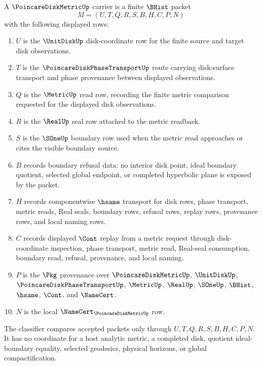 \begin{definition}
\label{def:poincare-disk-metric-carrier}
A $\PoincareDiskMetricUp$ carrier is a finite $\BHist$ packet
$$
M=(U,T,Q,R,S,B,H,C,P,N)
$$
with the following displayed rows:
\begin{enumerate}
\item $U$ is the $\UnitDiskUp$ disk-coordinate row for the finite source and target disk observations.
\item $T$ is the $\PoincareDiskPhaseTransportUp$ route carrying disk-surface transport and phase provenance between displayed observations.
\item $Q$ is the $\MetricUp$ read row, recording the finite metric comparison requested for the displayed disk observations.
\item $R$ is the $\RealUp$ seal row attached to the metric readback.
\item $S$ is the $\SOneUp$ boundary row used when the metric read approaches or cites the visible boundary source.
\item $B$ records boundary refusal data: no interior disk point, ideal boundary quotient, selected global endpoint, or completed hyperbolic plane is exposed by the packet.
\item $H$ records componentwise $\hsame$ transport for disk rows, phase transport, metric reads, Real seals, boundary rows, refusal rows, replay rows, provenance rows, and local naming rows.
\item $C$ records displayed $\Cont$ replay from a metric request through disk-coordinate inspection, phase transport, metric read, Real-seal consumption, boundary read, refusal, provenance, and local naming.
\item $P$ is the $\Pkg$ provenance over $\PoincareDiskMetricUp$, $\UnitDiskUp$, $\PoincareDiskPhaseTransportUp$, $\MetricUp$, $\RealUp$, $\SOneUp$, $\BHist$, $\hsame$, $\Cont$, and $\NameCert$.
\item $N$ is the local $\NameCert_{\PoincareDiskMetricUp}$ row.
\end{enumerate}
The classifier compares accepted packets only through $U,T,Q,R,S,B,H,C,P,N$. It has no coordinate for a host analytic metric, a completed disk, quotient ideal-boundary equality, selected geodesics, physical horizons, or global compactification.
\end{definition}


